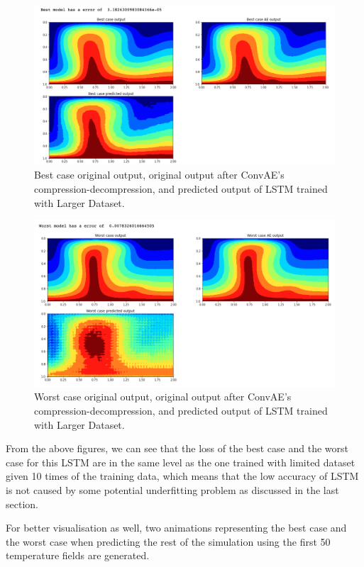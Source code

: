 \begin{figure}[H]
    \caption{Best case original output, original output after ConvAE's compression-decompression, and predicted output of LSTM trained with Larger Dataset.}
    \includegraphics[scale=0.5]{figures/mantle_convection_images/larger_dataset/LSTM_Best.png}
\end{figure}

\begin{figure}[H]
    \caption{Worst case original output, original output after ConvAE's compression-decompression, and predicted output of LSTM trained with Larger Dataset.}
    \includegraphics[scale=0.5]{figures/mantle_convection_images/larger_dataset/LSTM_Worst.png}
\end{figure}


From the above figures, we can see that the loss of the best case and the worst case for this LSTM are in the same level as the one trained with limited dataset given 10 times of the training data, which means that the low accuracy of LSTM is not caused by some potential underfitting problem as discussed in the last section.

For better visualisation as well, two animations representing the best case and the worst case when predicting the rest of the simulation using the first 50 temperature fields are generated.


